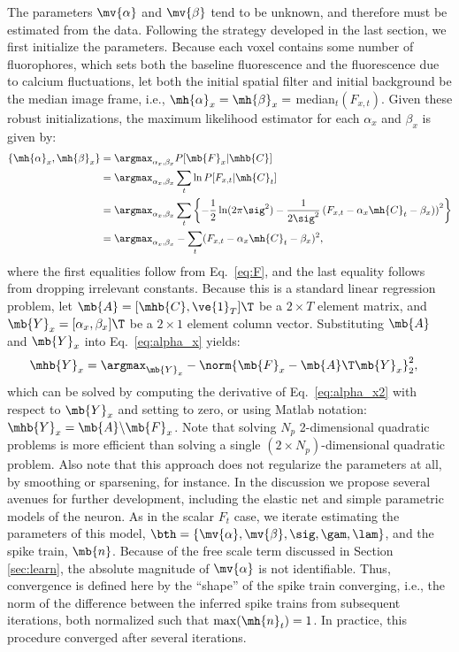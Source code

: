 The parameters $\mv{\alpha}$ and $\mv{\beta}$ tend to be unknown, and therefore must be estimated from the data.  Following the strategy developed in the last section, we first initialize the parameters.   Because each voxel contains some number of fluorophores, which sets both the baseline fluorescence and the fluorescence due to calcium fluctuations, let both the initial spatial filter and initial background be the median image frame, i.e., $\mh{\alpha}_x=\mh{\beta}_x=$ median$_t(F_{x,t})$.  Given these robust initializations, the maximum likelihood estimator for each $\alpha_x$ and $\beta_x$ is given by:
\begin{subequations} \label{eq:valpha_x}
\begin{align}
\{\mh{\alpha}_x,\mh{\beta}_x\} 
	&= \argmax_{\alpha_x,\beta_x} P[\mb{F}_x | \mhb{C}] \\
	&= \argmax_{\alpha_x,\beta_x} \sum_t \ln P[F_{x,t} | \mh{C}_t] \\
	&=\argmax_{\alpha_x,\beta_x} \sum_t  \left\{-\frac{1}{2} \ln (2\pi \sig^2) - \frac{1}{2\sig^2}\left(F_{x,t} - \alpha_x \mh{C}_t - \beta_x)\right)^2 \right\} \\
	&= \argmax_{\alpha_x,\beta_x} - \sum_t  (F_{x,t} - \alpha_x \mh{C}_t - \beta_x)^2, \label{eq:alpha_x}
\end{align}
\end{subequations}
where the first equalities follow from Eq.~\eqref{eq:F}, and the last equality follows from dropping irrelevant constants.  Because this is a standard linear regression problem, let $\mb{A}=[\mhb{C}, \ve{1}_T]\T$ be a $2\times T$ element matrix, and $\mb{Y}_x=[\alpha_x, \beta_x]\T$ be a $2\times 1$ element column vector.  Substituting $\mb{A}$ and $\mb{Y}_x$ into Eq.~\eqref{eq:alpha_x} yields:
\begin{align}
\mhb{Y}_x &= \argmax_{\mb{Y}_x} - \norm{\mb{F}_{x} - \mb{A}\T \mb{Y}_x}_2^2, \label{eq:alpha_x2}
\end{align}
which can be solved by computing the derivative of Eq.~\eqref{eq:alpha_x2} with respect to $\mb{Y}_x$ and setting to zero, or using Matlab notation: $\mhb{Y}_x = \mb{A} \backslash \mb{F}_x$.  Note that solving $N_p$ 2-dimensional quadratic problems is more efficient than solving a single $(2 \times N_p)$-dimensional quadratic problem.  Also note that this approach does not regularize the parameters at all, by smoothing or sparsening, for instance.  In the discussion we propose several avenues for further development, including the elastic net \cite{ZouHastie05} and simple parametric models of the neuron.   As in the scalar $F_t$ case, we iterate estimating the parameters of this model, $\bth = \{\mv{\alpha}, \mv{\beta}, \sig, \gam, \lam\}$, and the spike train, $\mb{n}$.  Because of the free scale term discussed in Section \ref{sec:learn}, the absolute magnitude of $\mv{\alpha}$ is not identifiable.  Thus, convergence is defined here by the ``shape'' of the spike train converging, i.e., the norm of the difference between the inferred spike trains from subsequent iterations, both normalized such that $\max(\mh{n}_t)=1$.  In practice, this procedure converged after several iterations.




